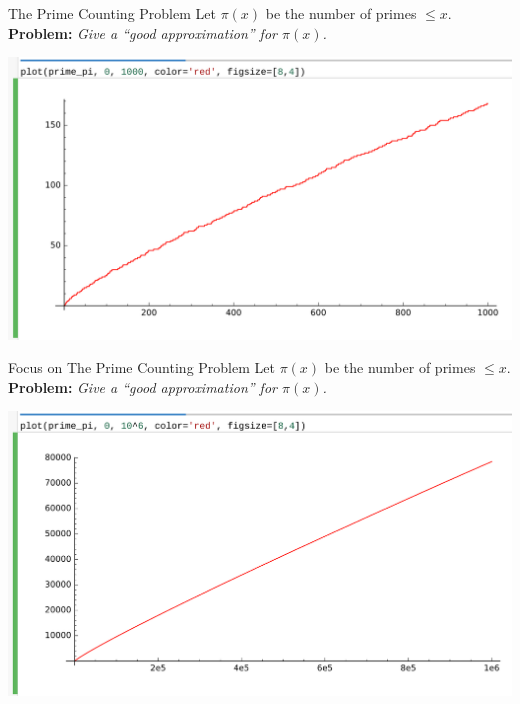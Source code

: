 \documentclass{beamer}
\begin{document}
\begin{frame}{The Prime Counting Problem}
  Let $\pi(x)$ be the number of primes $\leq x$.\\
  {\bf Problem:} {\em Give a ``good approximation'' for $\pi(x)$.}
  \vfill

  \includegraphics[width=.98\textwidth]{pics/prime-pi-1000}

\end{frame}

\begin{frame}{Focus on The Prime Counting Problem}
  Let $\pi(x)$ be the number of primes $\leq x$.\\
  {\bf Problem:} {\em Give a ``good approximation'' for $\pi(x)$.}
  \vfill

  \includegraphics[width=.98\textwidth]{pics/prime-pi-1000000}

\end{frame}
\end{document}
